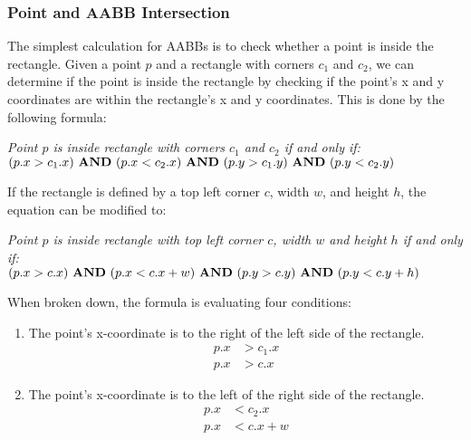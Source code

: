 \documentclass{article}
\renewcommand{\land}{\,\,\textrm{\textbf{AND}}\,\,}
\begin{document}
\subsubsection{Point and AABB Intersection}

The simplest calculation for AABBs is to check whether a point is inside the
rectangle. Given a point $p$ and a rectangle with corners $c_1$ and $c_2$, we
can determine if the point is inside the rectangle by checking if the point's x
and y coordinates are within the rectangle's x and y coordinates. This is done
by the following formula:
\begin{center}
    \textit{Point $p$ is inside rectangle with corners $c_1$ and $c_2$ if and only if:} \\
    $(p.x > c_1.x) \land (p.x < c_2.x) \land (p.y > c_1.y) \land (p.y < c_2.y)$
\end{center}

If the rectangle is defined by a top left corner $c$, width $w$, and height
$h$, the equation can be modified to:

\begin{center}
    \textit{Point $p$ is inside rectangle with top left corner $c$, width $w$ and height $h$ if and only if:} \\
    $(p.x > c.x) \land (p.x < c.x + w) \land (p.y > c.y) \land (p.y < c.y + h)$
\end{center}
When broken down, the formula is evaluating four conditions:
\begin{multicols}{2}
    \begin{enumerate}
        \item The point's x-coordinate is to the right of the left side of the rectangle.
              \begin{equation*}
                  \begin{aligned}
                      p.x & > c_1.x \\
                      p.x & > c.x
                  \end{aligned}
              \end{equation*}

        \item The point's x-coordinate is to the left of the right side of the rectangle.
              \begin{equation*}
                  \begin{aligned}
                      p.x & < c_2.x   \\
                      p.x & < c.x + w
                  \end{aligned}
              \end{equation*}
    \end{enumerate}
\end{multicols}
\end{document}
